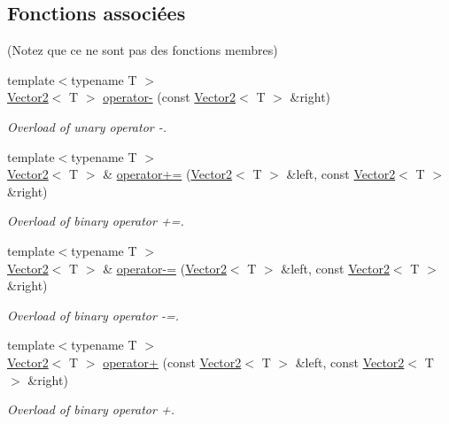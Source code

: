 \subsection*{Fonctions associées}
(Notez que ce ne sont pas des fonctions membres) \begin{DoxyCompactItemize}
\item 
{\footnotesize template$<$typename T $>$ }\\\hyperlink{classsf_1_1Vector2}{Vector2}$<$ T $>$ \hyperlink{classsf_1_1Vector2_a3885c2e66dc427cec7eaa178d59d8e8b}{operator-\/} (const \hyperlink{classsf_1_1Vector2}{Vector2}$<$ T $>$ \&right)
\begin{DoxyCompactList}\small\item\em Overload of unary operator -\/. \end{DoxyCompactList}\item 
{\footnotesize template$<$typename T $>$ }\\\hyperlink{classsf_1_1Vector2}{Vector2}$<$ T $>$ \& \hyperlink{classsf_1_1Vector2_ad4b7a9d355d57790bfc7df0ade8bb628}{operator+=} (\hyperlink{classsf_1_1Vector2}{Vector2}$<$ T $>$ \&left, const \hyperlink{classsf_1_1Vector2}{Vector2}$<$ T $>$ \&right)
\begin{DoxyCompactList}\small\item\em Overload of binary operator +=. \end{DoxyCompactList}\item 
{\footnotesize template$<$typename T $>$ }\\\hyperlink{classsf_1_1Vector2}{Vector2}$<$ T $>$ \& \hyperlink{classsf_1_1Vector2_a30a5a12ad03c9a3a982a0a313bf84e6f}{operator-\/=} (\hyperlink{classsf_1_1Vector2}{Vector2}$<$ T $>$ \&left, const \hyperlink{classsf_1_1Vector2}{Vector2}$<$ T $>$ \&right)
\begin{DoxyCompactList}\small\item\em Overload of binary operator -\/=. \end{DoxyCompactList}\item 
{\footnotesize template$<$typename T $>$ }\\\hyperlink{classsf_1_1Vector2}{Vector2}$<$ T $>$ \hyperlink{classsf_1_1Vector2_a72421239823c38a6b780c86a710ead07}{operator+} (const \hyperlink{classsf_1_1Vector2}{Vector2}$<$ T $>$ \&left, const \hyperlink{classsf_1_1Vector2}{Vector2}$<$ T $>$ \&right)
\begin{DoxyCompactList}\small\item\em Overload of binary operator +. \end{DoxyCompactList}\item 

\end{DoxyCompactItemize}

